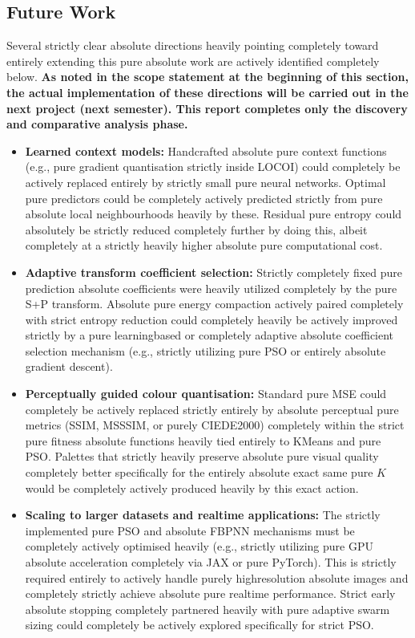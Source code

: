 \subsection{Future Work}

Several strictly clear absolute directions heavily pointing completely toward entirely extending this pure absolute work are actively identified completely below. \textbf{As noted in the scope statement at the beginning of this section, the actual implementation of these directions will be carried out in the next project (next semester). This report completes only the discovery and comparative analysis phase.}

\begin{itemize}
    \item \textbf{Learned context models:} Handcrafted absolute pure context functions (e.g., pure gradient quantisation strictly inside LOCOI) could completely be actively replaced entirely by strictly small pure neural networks. Optimal pure predictors could be completely actively predicted strictly from pure absolute local neighbourhoods heavily by these. Residual pure entropy could absolutely be strictly reduced completely further by doing this, albeit completely at a strictly heavily higher absolute pure computational cost.

    \item \textbf{Adaptive transform coefficient selection:} Strictly completely fixed pure prediction absolute coefficients were heavily utilized completely by the pure S+P transform. Absolute pure energy compaction actively paired completely with strict entropy reduction could completely heavily be actively improved strictly by a pure learningbased or completely adaptive absolute coefficient selection mechanism (e.g., strictly utilizing pure PSO or entirely absolute gradient descent).

    \item \textbf{Perceptually guided colour quantisation:} Standard pure MSE could completely be actively replaced strictly entirely by absolute perceptual pure metrics (SSIM, MSSSIM, or purely CIEDE2000) completely within the strict pure fitness absolute functions heavily tied entirely to KMeans and pure PSO. Palettes that strictly heavily preserve absolute pure visual quality completely better specifically for the entirely absolute exact same pure $K$ would be completely actively produced heavily by this exact action.

    \item \textbf{Scaling to larger datasets and realtime applications:} The strictly implemented pure PSO and absolute FBPNN mechanisms must be completely actively optimised heavily (e.g., strictly utilizing pure GPU absolute acceleration completely via JAX or pure PyTorch). This is strictly required entirely to actively handle purely highresolution absolute images and completely strictly achieve absolute pure realtime performance. Strict early absolute stopping completely partnered heavily with pure adaptive swarm sizing could completely be actively explored specifically for strict PSO.


\end{itemize}
